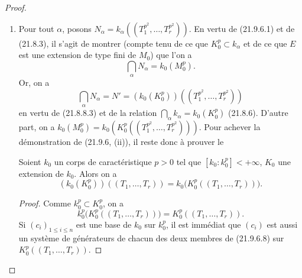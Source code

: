 \begin{proof}
\begin{enumerate}
  on a
  \[
    d(E/L_0,k/k_0)=d(E/K_0,k/k_0)=d(E/M_0,k/k_0),
  \]
  d'où, par une dernière application de (21.6.4.2),
  \[
    \delta=d(E/M_0,N/k_0),
  \]
  ce qui prouve (21.9.6.1). En outre, lorsque $k$ est remplacé par une
  sous-extension $k'$ de $k_0$, $N$ est remplacé par une sous-extension $N'$,
  donc $d(E/M_0,N'/k_0)\leqslant d(E/M_0,N/k_0)$ (21.6.4.2), ce qui démontre
  la dernière assertion de (i).

  \item[(ii)] Pour tout $\alpha$, posons
  $N_\alpha=k_\alpha((T_1^{p^2},\ldots,T_r^{p^2}))$. En vertu de (21.9.6.1)
  et de (21.8.3), il s'agit de montrer (compte tenu de ce que
  $K_0^p\subset k_\alpha$ et de ce que $E$ est une extension de type fini de
  $M_0$) que l'on a
  \[
    \bigcap_\alpha N_\alpha=k_0(M_0^p).
  \]
  Or, on a
  \begin{equation}
  \tag{21.9.6.6}
  \label{0.21.9.6.6-fr}
    \bigcap_\alpha N_\alpha=N'
    =(k_0(K_0^p))((T_1^{p^2},\ldots,T_r^{p^2}))
  \end{equation}
  en vertu de (21.8.8.3) et de la relation
  $\bigcap_\alpha k_\alpha=k_0(K_0^p)$ (21.8.6). D'autre part, on a
  $k_0(M_0^p)=k_0(K_0^p((T_1^{p^2},\ldots,T_r^{p^2})))$. Pour achever la
  démonstration de (21.9.6, (ii)), il reste donc à prouver le

  \begin{lemma}[21.9.6.7]
  \label{0.21.9.6.7-fr}
  Soient $k_0$ un corps de caractéristique $p>0$ tel que
  $[k_0:k_0^p]<+\infty$, $K_0$ une extension de $k_0$. Alors on a
  \begin{equation}
  \tag{21.9.6.8}
  \label{0.21.9.6.8-fr}
    (k_0(K_0^p))((T_1,\ldots,T_r))
    =k_0\bigl(K_0^p((T_1,\ldots,T_r))\bigr).
  \end{equation}
  \end{lemma}

  \begin{proof}
  Comme $k_0^p\subset K_0^p$, on a
  \[
    k_0^p\bigl(K_0^p((T_1,\ldots,T_r))\bigr)
    =K_0^p((T_1,\ldots,T_r)).
  \]
  Si $(c_i)_{1\leqslant i\leqslant n}$ est une base de $k_0$ sur $k_0^p$,
  il est immédiat que $(c_i)$ est aussi un système de générateurs de chacun
  des deux membres de (21.9.6.8) sur $K_0^p((T_1,\ldots,T_r))$.
  \end{proof}
\end{enumerate}
\end{proof}

